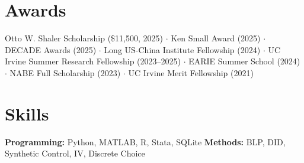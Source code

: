 \documentclass[11pt,letterpaper]{article}
\begin{document}
\section{Awards}
Otto W. Shaler Scholarship (\$11,500, 2025) $\cdot$ Ken Small Award (2025) $\cdot$ DECADE Awards (2025) $\cdot$ Long US-China Institute Fellowship (2024) $\cdot$ UC Irvine Summer Research Fellowship (2023--2025) $\cdot$ EARIE Summer School (2024) $\cdot$ NABE Full Scholarship (2023) $\cdot$ UC Irvine Merit Fellowship (2021)

\section{Skills}
\textbf{Programming:} Python, MATLAB, R, Stata, SQLite \quad \textbf{Methods:} BLP, DID, Synthetic Control, IV, Discrete Choice
\end{document}
